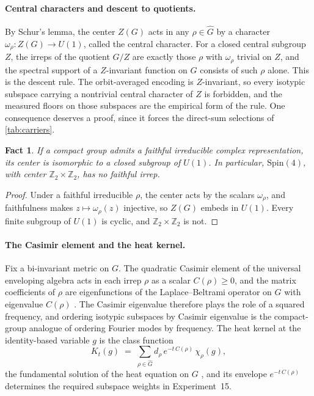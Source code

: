 \documentclass{article}
\newtheorem{fact}{Fact}
\newcommand{\Spin}{\mathrm{Spin}}
\newcommand{\Z}{\mathbb{Z}}
\begin{document}
\paragraph{Central characters and descent to quotients.}
By Schur's lemma, the center $Z(G)$ acts in any $\rho \in \widehat G$
by a character $\omega_\rho \colon Z(G) \to U(1)$, called the central
character. For a closed central subgroup $Z$, the irreps of the
quotient $G/Z$ are exactly those $\rho$ with $\omega_\rho$ trivial on
$Z$, and the spectral support of a $Z$-invariant function on $G$
consists of such $\rho$ alone. This is the descent rule. The
orbit-averaged encoding is $Z$-invariant, so every isotypic subspace
carrying a nontrivial central character of $Z$ is forbidden, and the
measured floors on those subspaces are the empirical form of the rule.
One consequence deserves a proof, since it forces the direct-sum
selections of \cref{tab:carriers}.

\begin{fact}
\label{fact:cyclic}
If a compact group admits a faithful irreducible complex
representation, its center is isomorphic to a closed subgroup of
$U(1)$. In particular, $\Spin(4)$, with center $\Z_2 \times \Z_2$, has
no faithful irrep.
\end{fact}

\begin{proof}
Under a faithful irreducible $\rho$, the center acts by the scalars
$\omega_\rho$, and faithfulness makes $z \mapsto \omega_\rho(z)$
injective, so $Z(G)$ embeds in $U(1)$. Every finite subgroup of $U(1)$
is cyclic, and $\Z_2 \times \Z_2$ is not.
\end{proof}

\paragraph{The Casimir element and the heat kernel.}
Fix a bi-invariant metric on $G$. The quadratic Casimir element of the
universal enveloping algebra acts in each irrep $\rho$ as a scalar
$C(\rho) \geq 0$, and the matrix coefficients of $\rho$ are
eigenfunctions of the Laplace--Beltrami operator on $G$ with eigenvalue
$C(\rho)$ \cite[Ch.~5]{sepanski2007}. The Casimir eigenvalue therefore
plays the role of a squared frequency, and ordering isotypic subspaces
by Casimir eigenvalue is the compact-group analogue of ordering Fourier
modes by frequency. The heat kernel at the identity-based variable $g$
is the class function
\[
K_t(g) \;=\; \sum_{\rho \in \widehat G} d_\rho\, e^{-t\,C(\rho)}\,
\chi_\rho(g),
\]
the fundamental solution of the heat equation on $G$
\cite[Ch.~1]{folland1995}, and its envelope $e^{-t\,C(\rho)}$
determines the required subspace weights in Experiment~15.
\end{document}
